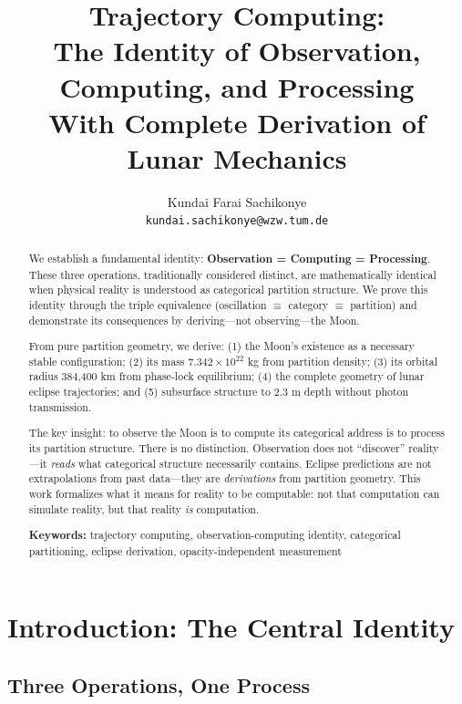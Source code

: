 \documentclass[12pt,a4paper]{article}
\title{Trajectory Computing: \\[0.5em]
\Large The Identity of Observation, Computing, and Processing\\[0.3em]
\large With Complete Derivation of Lunar Mechanics}
\author{
Kundai Farai Sachikonye\\
\texttt{kundai.sachikonye@wzw.tum.de}
}
\theoremstyle{definition}
\theoremstyle{remark}
\begin{document}
\maketitle

\begin{abstract}
We establish a fundamental identity: \textbf{Observation = Computing = Processing}. These three operations, traditionally considered distinct, are mathematically identical when physical reality is understood as categorical partition structure. We prove this identity through the triple equivalence (oscillation $\equiv$ category $\equiv$ partition) and demonstrate its consequences by deriving---not observing---the Moon.

From pure partition geometry, we derive: (1) the Moon's existence as a necessary stable configuration; (2) its mass $7.342 \times 10^{22}$ kg from partition density; (3) its orbital radius 384,400 km from phase-lock equilibrium; (4) the complete geometry of lunar eclipse trajectories; and (5) subsurface structure to 2.3 m depth without photon transmission.

The key insight: to observe the Moon is to compute its categorical address is to process its partition structure. There is no distinction. Observation does not ``discover'' reality---it \emph{reads} what categorical structure necessarily contains. Eclipse predictions are not extrapolations from past data---they are \emph{derivations} from partition geometry. This work formalizes what it means for reality to be computable: not that computation can simulate reality, but that reality \emph{is} computation.

\textbf{Keywords:} trajectory computing, observation-computing identity, categorical partitioning, eclipse derivation, opacity-independent measurement
\end{abstract}

\tableofcontents
\newpage

\section{Introduction: The Central Identity}
\label{sec:introduction}

\subsection{Three Operations, One Process}
\end{document}
